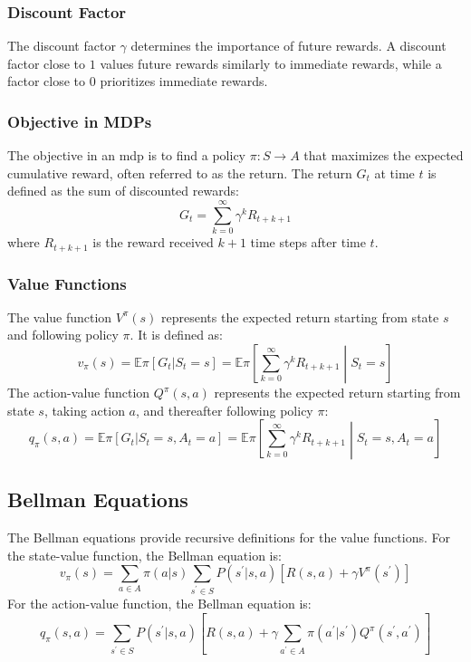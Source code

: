 \subsubsection*{Discount Factor}
The discount factor \(\gamma\) determines the importance of future rewards. 
A discount factor close to \(1\) values future rewards similarly to immediate rewards, 
while a factor close to \(0\) prioritizes immediate rewards.

\subsubsection*{Objective in MDPs}
The objective in an \gls{mdp} is to find a policy \(\pi: S \rightarrow A\) 
that maximizes the expected cumulative reward, often referred to as the return. 
The return \(G_t\) at time \(t\) is defined as the sum of discounted rewards:
\begin{equation}
    G_t = \sum_{k=0}^{\infty} \gamma^k R_{t+k+1}
\end{equation}
where \(R_{t+k+1}\) is the reward received \(k+1\) time steps after time \(t\).

\subsubsection*{Value Functions}
The value function \(V^\pi(s)\) represents the expected return starting from state \(s\) and 
following policy \(\pi\). It is defined as:
\begin{equation}
    v_\pi(s) = \mathbb{E}\pi [G_t | S_t = s] = \mathbb{E}\pi 
    \left[ \sum_{k=0}^{\infty} \gamma^k R_{t+k+1} \middle| S_t = s \right]
\end{equation}
The action-value function \(Q^\pi(s, a)\) represents the expected return starting from state \(s\),
taking action \(a\), and thereafter following policy \(\pi\):
\begin{equation}
    q_\pi(s, a) = \mathbb{E}\pi [G_t | S_t = s, A_t = a] 
    = \mathbb{E}\pi \left[ \sum_{k=0}^{\infty} \gamma^k R_{t+k+1} \middle| S_t =s, A_t =a \right]
\end{equation}

\subsection*{Bellman Equations}
The Bellman equations provide recursive definitions for the value functions. 
For the state-value function, the Bellman equation is:
\begin{equation}
    v_\pi(s) = \sum_{a \in A} \pi(a|s) \sum_{s^\prime \in S} P(s^\prime|s, a) 
    \left[R(s, a) + \gamma V^\pi(s^\prime)\right]
\end{equation}
For the action-value function, the Bellman equation is:
\begin{equation}
    q_\pi(s, a) = \sum_{s^\prime \in S} P(s^\prime|s, a)\left[R(s, a) 
    + \gamma \sum_{a^\prime \in A} \pi(a^\prime|s^\prime) Q^\pi(s^\prime, a^\prime)\right]
\end{equation}

